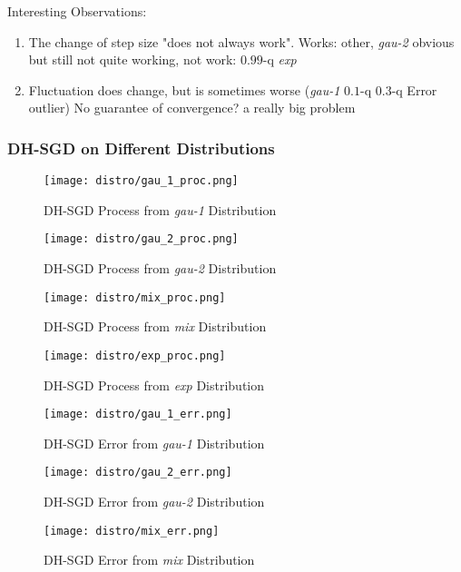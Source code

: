 Interesting Observations:

\begin{enumerate}
    \item The change of step size "does not always work". Works: other, \textit{gau-2} obvious but still not quite working, not work: $0.99$-q \textit{exp}
    \item Fluctuation does change, but is sometimes worse (\textit{gau-1} $0.1$-q $0.3$-q Error outlier) No guarantee of convergence? a really big problem
\end{enumerate}
\subsubsection{DH-SGD on Different Distributions}
\label{subsubsec: DH_SGD_exp_distro}
\begin{figure}[H]
    \centering
	\texttt{[image: distro/gau\_1\_proc.png]}
	\caption{DH-SGD Process from \textit{gau-1} Distribution}
\end{figure}

\begin{figure}[H]
    \centering
	\texttt{[image: distro/gau\_2\_proc.png]}
	\caption{DH-SGD Process from  \textit{gau-2} Distribution}
\end{figure}

\begin{figure}[H]
    \centering
	\texttt{[image: distro/mix\_proc.png]}
	\caption{DH-SGD Process from \textit{mix} Distribution}
\end{figure}

\begin{figure}[H]
    \centering
	\texttt{[image: distro/exp\_proc.png]}
	\caption{DH-SGD Process from \textit{exp} Distribution}
\end{figure}

\begin{figure}[H]
    \centering
	\texttt{[image: distro/gau\_1\_err.png]}
	\caption{DH-SGD Error from \textit{gau-1} Distribution}
\end{figure}

\begin{figure}[H]
    \centering
	\texttt{[image: distro/gau\_2\_err.png]}
	\caption{DH-SGD Error from  \textit{gau-2} Distribution}
\end{figure}

\begin{figure}[H]
    \centering
	\texttt{[image: distro/mix\_err.png]}
	\caption{DH-SGD Error from \textit{mix} Distribution}
\end{figure}

